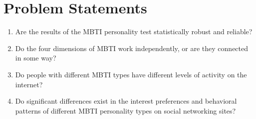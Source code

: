 \documentclass[12pt]{article}
\begin{document}
	\section{Problem Statements}
	\begin{enumerate}
		\item Are the results of the MBTI personality test statistically robust and reliable?
		\item Do the four dimensions of MBTI work independently, or are they connected in some way?
		\item Do people with different MBTI types have different levels of activity on the internet?
		\item Do significant differences exist in the interest preferences and behavioral patterns of different MBTI personality types on social networking sites?
	\end{enumerate}
	
\end{document}
